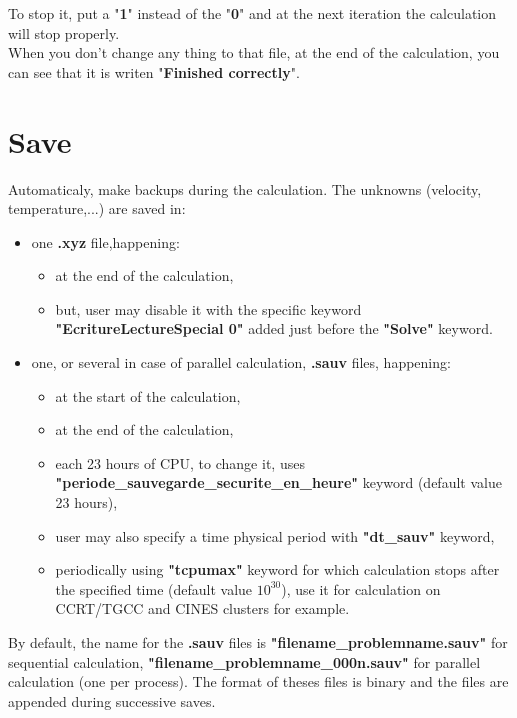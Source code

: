 To stop it, put a "\textbf{1}" instead of the "\textbf{0}" and at the next iteration the calculation will stop properly.\\

When you don't change any thing to that file, at the end of the calculation, you can see that it is writen "\textbf{Finished correctly}".



\section{Save}
Automaticaly, \trust make backups during the calculation. The unknowns (velocity, temperature,...) are saved in:
\begin{itemize}
\item one \textbf{.xyz} file,happening:
    \begin{itemize}
    \item at the end of the calculation,
    \item but, user may disable it with the specific keyword \textbf{"EcritureLectureSpecial 0"} added just before the \textbf{"Solve"} keyword.
    \end{itemize}


\item one, or several in case of parallel calculation, \textbf{.sauv} files, happening:
    \begin{itemize}
    \item at the start of the calculation,
    \item at the end of the calculation,
    \item each 23 hours of CPU, to change it, uses \small \textbf{"periode\_sauvegarde\_securite\_en\_heure"} \normalsize keyword (default value 23 hours),
    \item user may also specify a time physical period with \textbf{"dt\_sauv"} keyword,
    \item periodically using \textbf{"tcpumax"} keyword for which calculation stops after the specified time (default value $10^{30}$), use it for calculation on CCRT/TGCC and CINES clusters for example.
    \end{itemize}
\end{itemize}


By default, the name for the \textbf{.sauv} files is \textbf{"filename\_problemname.sauv"} for sequential calculation, \textbf{"filename\_problemname\_000n.sauv"} for parallel calculation (one per process).
The format of theses files is binary and the files are appended during successive saves.\\

